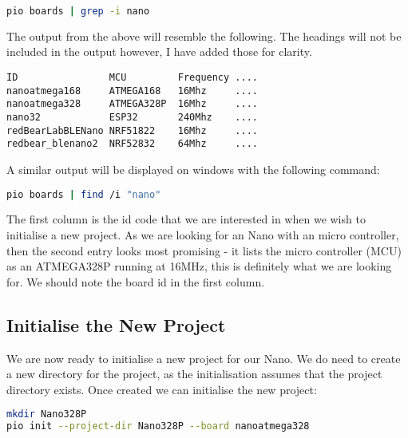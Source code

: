 \begin{lstlisting}[language={bash},numbers={none},caption={Linux - PIO - Listing Arduino Nano Boards}]
pio boards | grep -i nano 
\end{lstlisting}    

The output from the above will resemble the following. The headings will not be included in the output however, I have added those for clarity.

\begin{lstlisting}[numbers={none},caption={PIO - List of Arduino Nano Boards}]
ID                MCU         Frequency ....
nanoatmega168     ATMEGA168   16Mhz     ....
nanoatmega328     ATMEGA328P  16Mhz     ....
nano32            ESP32       240Mhz    ....
redBearLabBLENano NRF51822    16Mhz     ....
redbear_blenano2  NRF52832    64Mhz     ....
\end{lstlisting}    

A similar output will be displayed on windows with the following command:

\begin{lstlisting}[language={bash},numbers={none},caption={Windows - PIO - Listing Arduino Nano Boards}]
pio boards | find /i "nano" 
\end{lstlisting}    

The first column is the id code that we are interested in when we wish to initialise a new project. As we are looking for an  Nano with an  micro controller, then the second entry looks most promising - it lists the micro controller (MCU) as an ATMEGA328P running at 16MHz, this is definitely what we are looking for. We should note the board id in the first column.


\subsection{Initialise the New Project}\label{initialise-the-new-project}

We are now ready to initialise a new project for our Nano. We do need to create a new directory for the project, as the initialisation assumes that the project directory exists. Once created we can initialise the new project:

\begin{lstlisting}[language={bash},numbers={none},caption={PIO - Initialising a New Project}]
mkdir Nano328P
pio init --project-dir Nano328P --board nanoatmega328
\end{lstlisting}    
    

